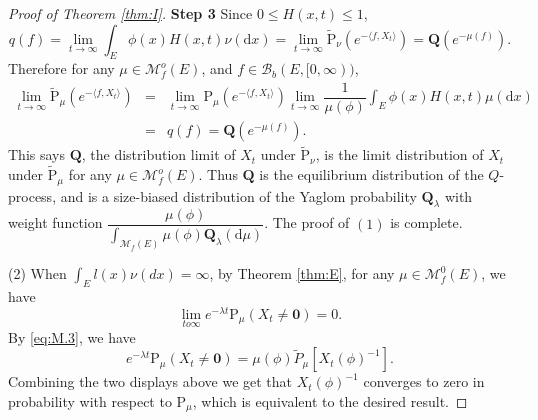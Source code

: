 \documentclass[12pt,a4paper]{amsart}
\numberwithin{equation}{section}
\theoremstyle{plain}
\theoremstyle{definition}
\theoremstyle{remark}
\begin{document}
\begin{proof}[Proof of Theorem \ref{thm:I}]
{\bf Step 3}\quad
Since $0\leq H(x,t)\leq 1$,
\begin{equation*}
q(f)
=\lim_{t\rightarrow\infty}\int_E\phi(x)H(x,t)\nu(\mathrm dx)
=\lim_{t\rightarrow\infty}\widetilde{\mathrm P}_{\nu}\left(e^{-\langle f, X_t\rangle }\right)
=\mathbf Q(e^{-\mu(f)}).
\end{equation*}
Therefore for any $\mu\in\mathcal M^o_f(E)$, and $f\in\mathcal B_b(E,[0,\infty))$,
\begin{eqnarray*}
\lim_{t\rightarrow\infty}\widetilde{\mathrm P}_\mu\left(e^{-\langle f, X_t\rangle}\right)&=&\lim_{t\rightarrow\infty}\mathrm P_\mu\left(e^{-\langle f, X_t\rangle}\right)
\lim_{t\to\infty}\dfrac{1}{\mu(\phi)}\int_E\phi(x)H(x, t)\mu(\mathrm dx)\\
&=&q(f)=\mathbf Q(e^{-\mu(f)}).
\end{eqnarray*}
This says $\mathbf Q$, the distribution limit of $X_t$ under $\widetilde{\mathrm P}_{\nu}$, is the  limit distribution of  $X_t$ under $\widetilde{\mathrm P}_{\mu}$ for any $\mu\in{\mathcal M}^o_f(E)$. Thus $\mathbf Q$ is the
equilibrium distribution of the $Q$-process, and is a size-biased distribution of the Yaglom probability $\mathbf Q_\lambda$ with weight function $\dfrac{\mu(\phi)}{\int_{{\mathcal M}_f(E)}\mu(\phi)\mathbf Q_\lambda(\mathrm d\mu)}$.  The proof of $(1)$ is complete.



(2) When $\int_El(x)\nu(dx)=\infty$,
by Theorem \ref{thm:E}, for any $\mu\in \mathcal M^0_f(E)$, we have
$$
\lim_{to\infty}e^{-\lambda t}\mathrm P_\mu(X_t\neq\mathbf 0)=0.
$$
By \eqref{eq:M.3}, we have
$$
e^{-\lambda t}\mathrm P_\mu(X_t\neq\mathbf 0)=\mu(\phi)\widetilde{P}_\mu[X_t(\phi)^{-1}].
$$
Combining the two displays above we get that $X_t(\phi)^{-1}$ converges to zero in probability
with respect to $\mathrm P_\mu$, which is equivalent to the desired result.
\end{proof}

\appendix
\section{}
\end{document}
